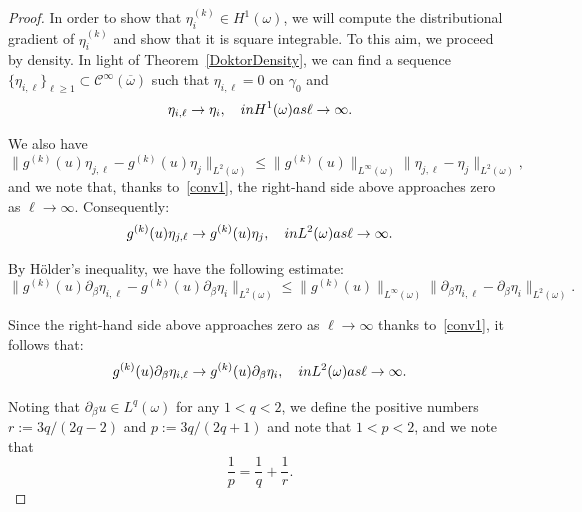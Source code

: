 \documentclass{amsart}
\begin{document}
\begin{proof}
	In order to show that $\eta_i^{(k)} \in H^1(\omega)$, we will compute the distributional gradient of $\eta_i^{(k)}$ and show that it is square integrable. To this aim, we proceed by density. In light of Theorem~\ref{DoktorDensity}, we can find a sequence $\{\eta_{i,\ell}\}_{\ell\ge 1} \subset \mathcal{C}^\infty(\overline{\omega})$ such that $\eta_{i,\ell}=0$ on $\gamma_0$ and 
	\begin{equation}
		\label{conv1}
		\eta_{i,\ell}\to\eta_i,\quad\textup{ in }H^1(\omega) \textup{ as }\ell\to\infty.
	\end{equation}
	
	We also have
	\begin{equation*}
		\label{est:1}
		\|g^{(k)}(u)\eta_{j,\ell}-g^{(k)}(u)\eta_j\|_{L^2(\omega)} \le \|g^{(k)}(u)\|_{L^\infty(\omega)}\|\eta_{j,\ell}-\eta_j\|_{L^2(\omega)},
	\end{equation*}
	and we note that, thanks to~\eqref{conv1}, the right-hand side above approaches zero as $\ell\to\infty$. Consequently:
	\begin{equation}
		\label{conv4}
		g^{(k)}(u)\eta_{j,\ell} \to g^{(k)}(u)\eta_j,\quad\textup{ in }L^2(\omega) \textup{ as }\ell\to\infty.
	\end{equation}
	
	By H\"older's inequality, we have the following estimate:
	\begin{equation*}
		\|g^{(k)}(u)\partial_\beta\eta_{i,\ell}-g^{(k)}(u)\partial_\beta\eta_i\|_{L^2(\omega)}
			\le \|g^{(k)}(u)\|_{L^\infty(\omega)}\|\partial_\beta\eta_{i,\ell}-\partial_\beta\eta_i\|_{L^2(\omega)}.
	\end{equation*}
	
	Since the right-hand side above approaches zero as $\ell\to\infty$ thanks to~\eqref{conv1}, it follows that:
	\begin{equation}
		\label{est:3}
		g^{(k)}(u)\partial_\beta\eta_{i,\ell} \to g^{(k)}(u)\partial_\beta\eta_i,\quad\textup{ in }L^2(\omega) \textup{ as }\ell\to\infty.
	\end{equation}
	
	Noting that $\partial_\beta u \in L^q(\omega)$ for any $1<q<2$, we define the positive numbers $r:=3q/(2q-2)$ and $p:=3q/(2q+1)$ and note that $1<p<2$, and we note that
	\begin{equation*}
		\dfrac{1}{p}=\dfrac{1}{q}+\dfrac{1}{r}.
	\end{equation*}
	

\end{proof}
\end{document}
